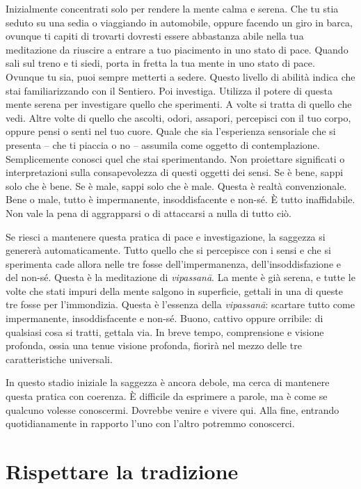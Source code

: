 Inizialmente concentrati solo per rendere la mente calma e serena. Che
tu stia seduto su una sedia o viaggiando in automobile, oppure facendo
un giro in barca, ovunque ti capiti di trovarti dovresti essere
abbastanza abile nella tua meditazione da riuscire a entrare a tuo
piacimento in uno stato di pace. Quando sali sul treno e ti siedi, porta
in fretta la tua mente in uno stato di pace. Ovunque tu sia, puoi sempre
metterti a sedere. Questo livello di abilità indica che stai
familiarizzando con il Sentiero. Poi investiga. Utilizza il potere di
questa mente serena per investigare quello che sperimenti. A volte si
tratta di quello che vedi. Altre volte di quello che ascolti, odori,
assapori, percepisci con il tuo corpo, oppure pensi o senti nel tuo
cuore. Quale che sia l'esperienza sensoriale che si presenta -- che ti
piaccia o no -- assumila come oggetto di contemplazione. Semplicemente
conosci quel che stai sperimentando. Non proiettare significati o
interpretazioni sulla consapevolezza di questi oggetti dei sensi. Se è
bene, sappi solo che è bene. Se è male, sappi solo che è male. Questa è
realtà convenzionale. Bene o male, tutto è impermanente, insoddisfacente
e non-sé. È tutto inaffidabile. Non vale la pena di aggrapparsi o di
attaccarsi a nulla di tutto ciò.

Se riesci a mantenere questa pratica di pace e investigazione, la
saggezza si genererà automaticamente. Tutto quello che si percepisce con
i sensi e che si sperimenta cade allora nelle tre fosse
dell'impermanenza, dell'insoddisfazione e del non-sé. Questa è la
meditazione di \emph{vipassanā}. La mente è già serena, e tutte le volte
che stati impuri della mente salgono in superficie, gettali in una di
queste tre fosse per l'immondizia. Questa è l'essenza della
\emph{vipassanā}: scartare tutto come impermanente, insoddisfacente e
non-sé. Buono, cattivo oppure orribile: di qualsiasi cosa si tratti,
gettala via. In breve tempo, comprensione e visione profonda, ossia una
tenue visione profonda, fiorirà nel mezzo delle tre caratteristiche
universali.

In questo stadio iniziale la saggezza è ancora debole, ma cerca di
mantenere questa pratica con coerenza. È difficile da esprimere a
parole, ma è come se qualcuno volesse conoscermi. Dovrebbe venire e
vivere qui. Alla fine, entrando quotidianamente in rapporto l'uno con
l'altro potremmo conoscerci.

\section{Rispettare la tradizione}

